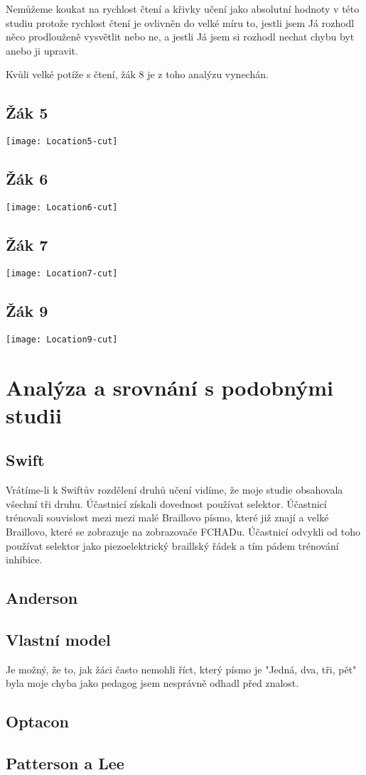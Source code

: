 Nemůžeme koukat na rychlost čtení a křivky učení jako absolutní hodnoty v této studiu protože rychlost čtení je ovlivněn do velké míru to, jestli jsem Já rozhodl něco prodlouženě vysvětlit nebo ne, a jestli Já jsem si rozhodl nechat chybu byt anebo ji upravit.

Kvůli velké potíže s čtení, žák 8 je z toho analýzu vynechán.

\subsection{Žák 5}
\texttt{[image: Location5-cut]}
\subsection{Žák 6}
\texttt{[image: Location6-cut]}
\subsection{Žák 7}
\texttt{[image: Location7-cut]}
\subsection{Žák 9}
\texttt{[image: Location9-cut]}

\section{Analýza a srovnání s podobnými studii}


\subsection{Swift}
Vrátíme-li k Swiftův rozdělení druhů učení vidíme, že moje studie obsahovala všechní tři druhu.  Účastnicí získali dovednost používat selektor.  Účastnicí trénovali souvislost mezi mezi malé Braillovo písmo, které již znají a velké Braillovo, které se zobrazuje na zobrazovače FCHADu.  Účastnicí odvykli od toho používat selektor jako piezoelektrický braillský řádek a tím pádem trénování inhibice.

\subsection{Anderson}
\subsection{Vlastní model}
Je možný, že to, jak žáci často nemohli říct, který písmo je "Jedná, dva, tři, pět" byla moje chyba jako pedagog jsem nesprávně odhadl před znalost.
\subsection{Optacon}
\subsection{Patterson a Lee}
